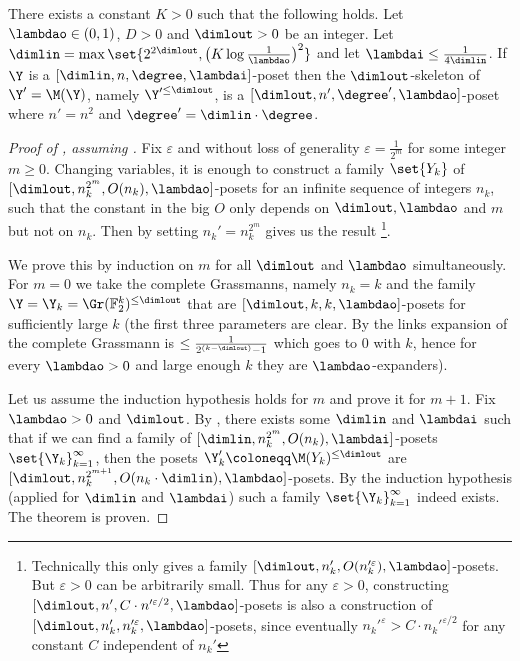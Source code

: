 \begin{theorem}\label{thm:one-step-of-recursion}
    There exists a constant \(K > 0\) such that the following holds. Let \(\lambdao \in (0,1)\), \(D > 0\) and \(\dimlout >0\) be an integer. Let \(\dimlin = \max \set{2^{2\dimlout},\left (K \log \frac{1}{\lambdao} \right )^2}\) and let \(\lambdai \leq \frac{1}{4\dimlin}\). If \(\Y\) is a \([\dimlin, n, \degree, \lambdai]\)-poset then the \(\dimlout\)-skeleton of \(\Y' = \M(\Y)\), namely \(\Y'^{\leq \dimlout}\), is a \([\dimlout, n', \degree ' , \lambdao]\)-poset where \(n' = n^2\) and \(\degree' = \dimlin \cdot \degree\).
\end{theorem}

\begin{proof}[Proof of , assuming ]
    Fix \(\varepsilon\) and without loss of generality \(\varepsilon = \frac{1}{2^m}\) for some integer \(m \geq 0\). Changing variables, it is enough to construct a family \(\set{Y_k}\) of \([\dimlout,n_k^{2^m},O(n_k),\lambdao]\)-posets for an infinite sequence of integers \(n_k\), such that the constant in the big \(O\) only depends on \(\dimlout,\lambdao\) and \(m\) but not on \(n_k\). Then by setting \(n_k' = n_k^{2^m}\) gives us the result \footnote{Technically this only gives a family \([\dimlout,n_k',O(n_k'^\varepsilon),\lambdao]\)-posets. But \(\varepsilon > 0\) can be arbitrarily small. Thus for any \(\varepsilon > 0\), constructing \([\dimlout,n',C \cdot n'^{\varepsilon/2},\lambdao]\)-posets is also a construction of \([\dimlout,n_k',n_k'^{\varepsilon},\lambdao]\)-posets, since eventually \(n_k'^{\varepsilon} > C \cdot n_k'^{\varepsilon/2}\) for any constant \(C\) independent of \(n_k'\)}.
    
    We prove this by induction on \(m\) for all \(\dimlout\) and \(\lambdao\) simultaneously. For \(m=0\) we take the complete Grassmanns, namely \(n_k = k\) and the family \(\Y =\Y_k = \Gr(\mathbb{F}_2^k)^{\leq \dimlout}\) that are \([\dimlout,k,k,\lambdao]\)-posets for sufficiently large \(k\) (the first three parameters are clear. By  the links expansion of the complete Grassmann is \(\leq \frac{1}{2^{(k-\dimlout)}-1}\) which goes to \(0\) with \(k\), hence for every \(\lambdao > 0\) and large enough \(k\) they are \(\lambdao\)-expanders).
    
    Let us assume the induction hypothesis holds for \(m\) and prove it for \(m+1\). Fix \(\lambdao > 0\) and \(\dimlout\). By , there exists some \(\dimlin\) and \(\lambdai\) such that if we can find a family of \([\dimlin, n_k^{2^m},O(n_k),\lambdai]\)-posets \(\set{\Y_k}_{k=1}^\infty\), then the posets \(\Y_k' \coloneqq \M(Y_k)^{\leq \dimlout}\) are \([\dimlout, n_k^{2^{m+1}},O(n_k \cdot \dimlin),\lambdao]\)-posets. By the induction hypothesis (applied for \(\dimlin\) and \(\lambdai\)) such a family \(\set{\Y_k}_{k=1}^\infty\) indeed exists. The theorem is proven.%
\end{proof}

